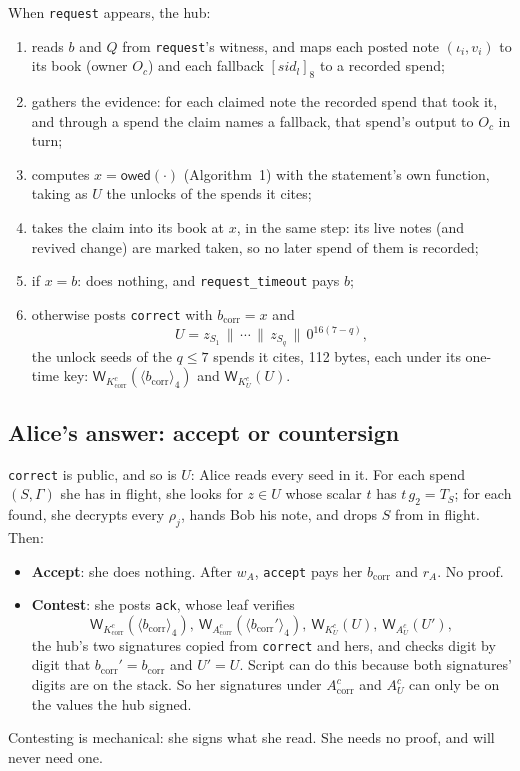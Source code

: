 \documentclass[11pt]{article}
\theoremstyle{plain}
\theoremstyle{definition}
\newcommand{\bcorr}{b_{\mathrm{corr}}}
\newcommand{\tx}[1]{\texttt{#1}}
\newcommand{\be}[2]{\langle #1\rangle_{#2}}
\newcommand{\pre}[2]{[#1]_{#2}}
\newcommand{\Wots}{\mathsf{W}}
\newcommand{\sid}{\mathit{sid}}
\newcommand{\owed}{\mathsf{owed}}
\newcommand{\Oc}{O_c}
\newcommand{\Kcorr}{K_{\mathrm{corr}}^{c}}
\newcommand{\KU}{K_{U}^{c}}
\newcommand{\Acorr}{A_{\mathrm{corr}}^{c}}
\newcommand{\AU}{A_{U}^{c}}
\begin{document}
When \tx{request} appears, the hub:
\begin{enumerate}[nosep]
\item reads $b$ and $Q$ from \tx{request}'s witness, and maps each posted
  note $(\iota_i, v_i)$ to its book (owner $\Oc$) and each fallback
  $\pre{\sid_l}{8}$ to a recorded spend;
\item gathers the evidence: for each claimed note the recorded spend that
  took it, and through a spend the claim names a fallback, that spend's
  output to $\Oc$ in turn;
\item computes $x = \owed(\cdot)$ (Algorithm~1) with the statement's own
  function, taking as $U$ the unlocks of the spends it cites;
\item takes the claim into its book at $x$, in the same step: its live
  notes (and revived change) are marked taken, so no later spend of them
  is recorded;
\item if $x = b$: does nothing, and \tx{request\_timeout} pays $b$;
\item otherwise posts \tx{correct} with $\bcorr = x$ and
  \[
    U = z_{S_1} \,\|\, \cdots \,\|\, z_{S_q} \,\|\, 0^{16(7 - q)},
  \]
  the unlock seeds of the $q \le 7$ spends it cites, 112 bytes, each
  under its one-time key: $\Wots_{\Kcorr}(\be{\bcorr}{4})$ and
  $\Wots_{\KU}(U)$.
\end{enumerate}

\subsection{Alice's answer: accept or countersign}\label{sec:ack}

\tx{correct} is public, and so is $U$: Alice reads every seed in it.
For each spend $(S, \Gamma)$ she has in flight, she looks for $z \in U$
whose scalar $t$ has $t\,g_2 = T_S$; for each found, she decrypts every
$\rho_j$, hands Bob his note, and drops $S$ from in flight. Then:
\begin{itemize}[nosep]
\item \textbf{Accept}: she does nothing. After $w_A$, \tx{accept} pays
  her $\bcorr$ and $r_A$. No proof.
\item \textbf{Contest}: she posts \tx{ack}, whose leaf verifies
  \[
    \Wots_{\Kcorr}(\be{\bcorr}{4}),\ \Wots_{\Acorr}(\be{\bcorr'}{4}),\
    \Wots_{\KU}(U),\ \Wots_{\AU}(U'),
  \]
  the hub's two signatures copied from \tx{correct} and hers, and checks
  digit by digit that $\bcorr' = \bcorr$ and $U' = U$. Script can do
  this because both signatures' digits are on the stack. So her
  signatures under $\Acorr$ and $\AU$ can only be on the values the hub
  signed.
\end{itemize}
Contesting is mechanical: she signs what she read. She needs no proof,
and will never need one.
\end{document}
